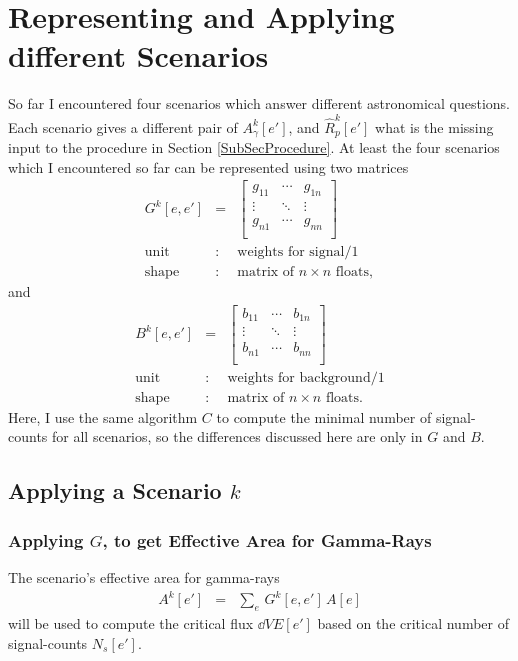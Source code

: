 \documentclass{article}%
\begin{document}
\section{Representing and Applying different Scenarios}
%
So far I encountered four scenarios which answer different astronomical questions.
%
Each scenario gives a different pair of $A^k_\gamma[e']$, and $\hat{R}^k_p[e']$ what is the missing input to the procedure in Section \ref{SubSecProcedure}.
%
At least the four scenarios which I encountered so far can be represented using two matrices
%
\begin{eqnarray*}
G^k[e, e'] &=&
  \left[ {\begin{array}{ccc}
    g_{11} & \cdots & g_{1n}\\
    \vdots & \ddots & \vdots\\
    g_{n1} & \cdots & g_{nn}\\
  \end{array} } \right]\\
\text{unit} &:& \text{weights for signal}/1\\
\text{shape} &:& \text{matrix of}\,\,n \times n \,\,\text{floats},
\end{eqnarray*}
%
and
%
\begin{eqnarray*}
B^k[e, e'] &=&
  \left[ {\begin{array}{cccc}
    b_{11} & \cdots & b_{1n}\\
    \vdots & \ddots & \vdots\\
    b_{n1} & \cdots & b_{nn}\\
  \end{array} } \right]\\
\text{unit} &:& \text{weights for background}/1\\
\text{shape} &:& \text{matrix of}\,\,n \times n \,\,\text{floats}.
\end{eqnarray*}
%
Here, I use the same algorithm $C$ to compute the minimal number of signal-counts for all scenarios, so the differences discussed here are only in $G$ and $B$.
%
\subsection{Applying a Scenario $k$}
%
\subsubsection*{Applying $G$, to get Effective Area for Gamma-Rays}
%
The scenario's effective area for gamma-rays
%
\begin{eqnarray}
A^k[e'] &=& \sum_{e} \, G^k[e, e'] \, A[e]
\end{eqnarray}
%
will be used to compute the critical flux $\dd{V}{E}[e']$ based on the critical number of signal-counts $N_s[e']$.
%
\end{document}
